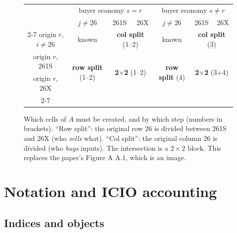 \documentclass[11pt,a4paper]{article}
\theoremstyle{remark}
\theoremstyle{definition}
\newcommand{\sem}{{261S}}   %
\newcommand{\oth}{{26X}}    %
\begin{document}
\begin{figure}[ht]
\centering
\renewcommand{\arraystretch}{1.3}
\begin{tabular}{c|ccc|ccc|}
 \multicolumn{1}{c}{} & \multicolumn{3}{c}{buyer economy $s=r$} & \multicolumn{3}{c}{buyer economy $s\neq r$} \\
 \multicolumn{1}{c}{} & $j\neq 26$ & \sem & \multicolumn{1}{c}{\oth} & $j\neq 26$ & \sem & \multicolumn{1}{c}{\oth} \\ \cline{2-7}
 origin $r$, $i\neq 26$ & known & \multicolumn{2}{c|}{\textbf{col split} (1--2)} & known & \multicolumn{2}{c|}{\textbf{col split} (3)} \\
 origin $r$, \sem & \multirow{2}{*}{\textbf{row split} (1--2)} & \multicolumn{2}{c|}{\multirow{2}{*}{\textbf{2$\times$2} (1--2)}} & \multirow{2}{*}{\textbf{row split} (4)} & \multicolumn{2}{c|}{\multirow{2}{*}{\textbf{2$\times$2} (3+4)}}\\
 origin $r$, \oth & & & & & & \\ \cline{2-7}
\end{tabular}
\caption{Which cells of $A$ must be created, and by which step (numbers in brackets). ``Row split'': the
original row 26 is divided between \sem{} and \oth{} (who \emph{sells} what). ``Col split'': the original
column 26 is divided (who \emph{buys} inputs). The intersection is a $2\times 2$ block. This replaces the
paper's Figure A A.1, which is an image.}
\label{fig:blocks}
\end{figure}

\section{Notation and ICIO accounting}

\subsection{Indices and objects}
\end{document}
